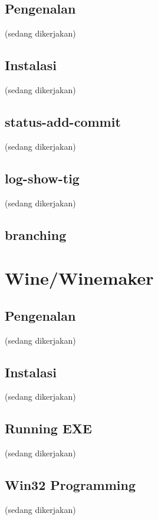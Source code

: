 \documentclass[12pt,]{article}
\begin{document}
	\subsection{Pengenalan}
	(sedang dikerjakan)
	
	\subsection{Instalasi}
	(sedang dikerjakan)
	
	\subsection{status-add-commit}
	(sedang dikerjakan)
	
	\subsection{log-show-tig}
	(sedang dikerjakan)
	
	\subsection{branching}
	
	\section{Wine/Winemaker}
	
	\subsection{Pengenalan}
	(sedang dikerjakan)
	
	\subsection{Instalasi}
	(sedang dikerjakan)
	
	\subsection{Running EXE}
	(sedang dikerjakan)
	
	\subsection{Win32 Programming}
	(sedang dikerjakan)
	
\end{document}
